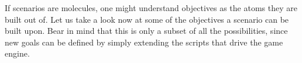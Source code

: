 

If scenarios are molecules, one might understand objectives as the atoms they are built out of. Let us take a look now at some of the objectives a scenario can be built upon. Bear in mind that this is only a subset of all the possibilities, since new goals can be defined by simply extending the scripts that drive the game engine.


